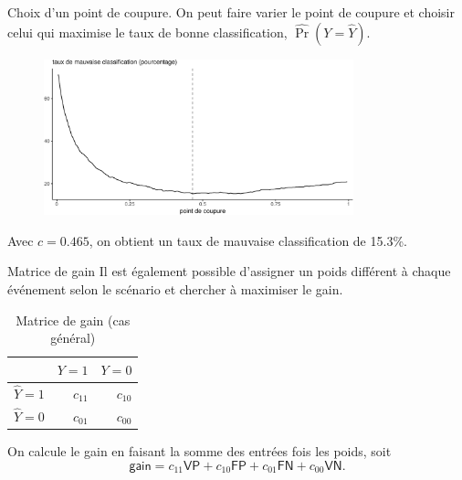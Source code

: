 \documentclass[
  ignorenonframetext,
]{beamer}
\begin{document}
\begin{frame}{Choix d'un point de coupure.}
\protect\hypertarget{choix-dun-point-de-coupure.}{}
On peut faire varier le point de coupure et choisir celui qui maximise
le taux de bonne classification, \(\widehat{\Pr}(Y = \widehat{Y})\).

\begin{figure}

{\centering \includegraphics[width=0.8\textwidth,height=\textheight]{MATH60602-diapos7_files/figure-beamer/unnamed-chunk-7-1.pdf}

}

\end{figure}

Avec \(c=0.465\), on obtient un taux de mauvaise classification de
15.3\%.
\end{frame}

\begin{frame}{Matrice de gain}
\protect\hypertarget{matrice-de-gain}{}
Il est également possible d'assigner un poids différent à chaque
événement selon le scénario et chercher à maximiser le gain.

\hypertarget{tbl-tableconfumat4}{}
\begin{table}
\caption{\label{tbl-tableconfumat4}Matrice de gain (cas général) }\tabularnewline

\centering
\begin{tabular}{lrr}
\toprule
  & \(Y=1\) & \(Y=0\)\\
\midrule
\(\widehat{Y}=1\) & $c_{11}$ & $c_{10}$\\
\(\widehat{Y}=0\) & $c_{01}$ & $c_{00}$\\
\bottomrule
\end{tabular}
\end{table}

On calcule le gain en faisant la somme des entrées fois les poids, soit
\[\textsf{gain} = c_{11}\mathsf{VP} + c_{10}\mathsf{FP} + c_{01}\mathsf{FN} + c_{00}\mathsf{VN}.\]
\end{frame}
\end{document}
